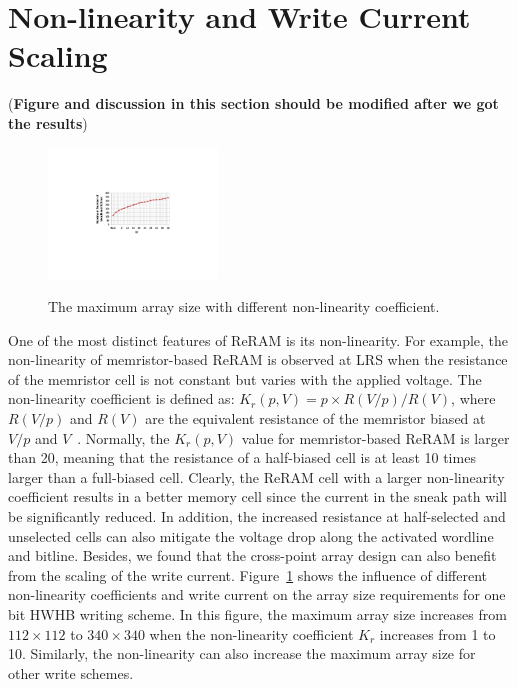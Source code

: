\section{Non-linearity and Write Current Scaling}\label{sec:scale}
(\textbf{Figure and discussion in this section should be modified after we
got the results})
\begin{figure}[!b]
\centering
  \includegraphics[width=0.4\textwidth]{./figures/non_linear_f}\\
  \caption{The maximum array size with different non-linearity coefficient.}\label{fig:non_linear}
\end{figure}
One of the most distinct features of ReRAM is its non-linearity. For
example, the non-linearity of memristor-based ReRAM is observed at LRS
when the resistance of the memristor cell is not constant but varies with
the applied voltage. The non-linearity coefficient is defined as:
$K_r(p,V) = p \times R(V/p)/R(V)$, where $R(V/p)$ and $R(V)$ are the
equivalent resistance of the memristor biased at $V/p$ and
$V$~\cite{memristor:Cong}. Normally, the $K_r(p,V)$ value for
memristor-based ReRAM is larger than 20, meaning that the resistance of a
half-biased  cell is at least 10 times larger than a full-biased cell.
Clearly, the ReRAM cell with a larger non-linearity coefficient results in
a better memory cell since the current in the sneak path will be
significantly reduced. In addition, the increased resistance at
half-selected and unselected cells can also mitigate the voltage drop
along the activated wordline and bitline. Besides, we found that the
cross-point array design can also benefit from the scaling of the write
current. Figure~\ref{fig:non_linear} shows the influence of different
non-linearity coefficients and write current on the array size
requirements for one bit HWHB writing scheme. In this figure, the maximum
array size increases from $112 \times 112$ to $340 \times 340$ when the
non-linearity coefficient $K_r$ increases from 1 to 10. Similarly, the
non-linearity can also increase the maximum array size for other write
schemes.

